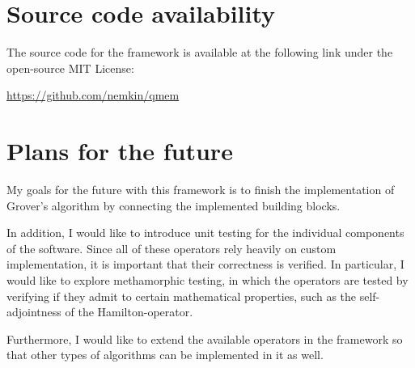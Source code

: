 \section{Source code availability}

The source code for the framework is available at the following link under the open-source MIT License:

\href{https://github.com/nemkin/qmem}{https://github.com/nemkin/qmem}

\section{Plans for the future}

My goals for the future with this framework is to finish the implementation of Grover's algorithm by connecting the implemented building blocks.

In addition, I would like to introduce unit testing for the individual components of the software. Since all of these operators rely heavily on custom implementation, it is important that their correctness is verified. In particular, I would like to explore methamorphic testing, in which the operators are tested by verifying if they admit to certain mathematical properties, such as the self-adjointness of the Hamilton-operator.

Furthermore, I would like to extend the available operators in the framework so that other types of algorithms can be implemented in it as well.
